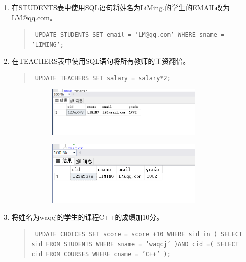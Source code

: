 \documentclass[a4paper,twoside]{article}
\begin{document}
\begin{spacing}{1.2}
\begin{enumerate}
  \item 在STUDENTS表中使用SQL语句将姓名为LiMing.的学生的EMAIL改为LM@qq.com。
  \begin{quote}
    \texttt{
      UPDATE STUDENTS SET email = 'LM@qq.com' WHERE sname = 'LIMING';\\
    }
  \end{quote}
  \item 在TEACHERS表中使用SQL语句将所有教师的工资翻倍。
  \begin{quote}
    \texttt{
      UPDATE TEACHERS SET salary = salary*2;\\
    }
  \end{quote}


  \begin{figure}[htb]
    \centering
    \begin{subfigure}{0.4\textwidth}
      \centering
      \includegraphics[width=0.9\textwidth]{3.png}
    \end{subfigure}
    \begin{subfigure}{0.4\textwidth}
      \centering
      \includegraphics[width=0.9\textwidth]{4.png}
    \end{subfigure}
  \end{figure}
  

  \item 将姓名为waqcj的学生的课程C++的成绩加10分。
  \begin{quote}
    \texttt{
      UPDATE CHOICES SET score = score +10
WHERE sid in (
    SELECT sid
    FROM STUDENTS
    WHERE sname = 'waqcj'
    )AND cid =(
        SELECT cid
        FROM COURSES
        WHERE cname = 'C++'
    );\\
    }
  \end{quote}



\end{enumerate}
\end{spacing}
\end{document}

